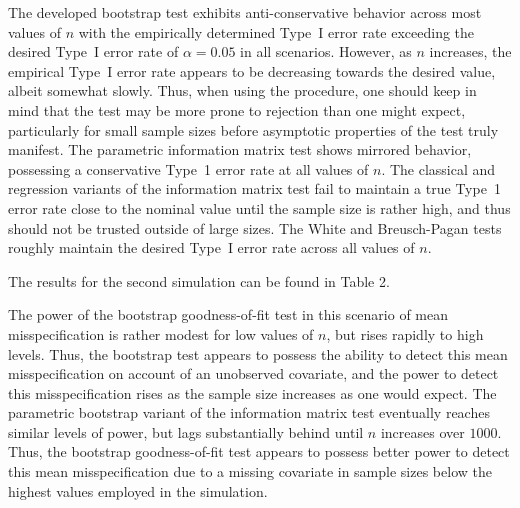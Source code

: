 \documentclass[review]{elsarticle}
\begin{document}
The developed bootstrap test exhibits anti-conservative behavior across most values of $n$ with the empirically determined Type~I error rate exceeding the desired Type~I error rate
of $\alpha = 0.05$ in all scenarios. However, as $n$ increases, the empirical Type~I error rate appears to be decreasing towards the desired value, albeit somewhat slowly. Thus, when
using the procedure, one should keep in mind that the test may be more prone to
rejection than one might expect, particularly for small sample sizes before asymptotic properties of the test truly manifest. The parametric information matrix test shows mirrored behavior,
possessing a conservative Type~1 error rate at all values of $n$. The classical and regression variants of the information matrix test fail to maintain a true Type~1 error rate close
to the nominal value until the sample size is rather high, and thus should not be trusted outside of large sizes. The White and Breusch-Pagan tests roughly maintain the desired Type~I error rate across all values of $n$.

The results for the second simulation can be found in Table 2.

\begin{table}[H]
	\centering
	\small\addtolength{\tabcolsep}{-3pt}
	\setlength\extrarowheight{-3pt}
	{
	}
	\end{table}

The power of the bootstrap goodness-of-fit test in this scenario of mean misspecification is rather modest for low values of $n$, but rises rapidly to high levels. Thus, the bootstrap test appears to possess the
ability to detect this mean misspecification on account of an unobserved covariate, and the power to detect this misspecification rises as the sample size increases as one would expect.
The parametric bootstrap variant of the information matrix test eventually reaches similar levels of power, but lags substantially behind until $n$ increases over $1000$. Thus, the bootstrap
goodness-of-fit test appears to possess better power to detect this mean misspecification due to a missing covariate in sample sizes below the highest values employed in the simulation.
\end{document}
